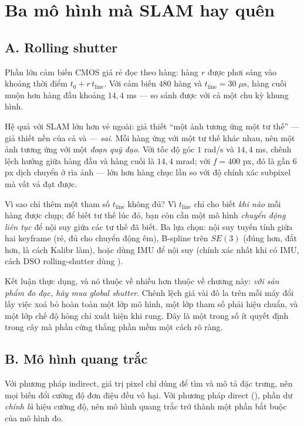 \documentclass[../../vslam.tex]{subfiles}
\begin{document}
\section{Ba mô hình mà SLAM hay quên}

\subsection{A. Rolling shutter}

Phần lớn cảm biến CMOS giá rẻ đọc theo hàng: hàng \(r\) được phơi sáng vào khoảng thời điểm \(t_0 + r\,t_{\text{line}}\). Với cảm biến \(480\) hàng và \(t_{\text{line}} = 30\;\mu\text{s}\), hàng cuối muộn hơn hàng đầu khoảng \(14{,}4\) ms --- so sánh được với cả một chu kỳ khung hình.

Hệ quả với SLAM lớn hơn vẻ ngoài: giả thiết ``một ảnh tương ứng một tư thế'' --- giả thiết nền của cả  và  --- \emph{sai}. Mỗi hàng ứng với một tư thế khác nhau, nên một ảnh tương ứng với một \emph{đoạn quỹ đạo}. Với tốc độ góc \(1\) rad/s và \(14{,}4\) ms, chênh lệch hướng giữa hàng đầu và hàng cuối là \(14{,}4\) mrad; với \(f = 400\) px, đó là gần \(6\) px dịch chuyển ở rìa ảnh --- lớn hơn hàng chục lần so với độ chính xác subpixel mà  vất vả đạt được.

Vì sao chỉ thêm một tham số \(t_{\text{line}}\) không đủ? Vì \(t_{\text{line}}\) chỉ cho biết \emph{khi nào} mỗi hàng được chụp; để biết tư thế lúc đó, bạn còn cần một mô hình \emph{chuyển động liên tục} để nội suy giữa các tư thế đã biết. Ba lựa chọn: nội suy tuyến tính giữa hai keyframe (rẻ, đủ cho chuyển động êm), B-spline trên \(SE(3)\) \cite{furgale2012continuous} (đúng hơn, đắt hơn, là cách Kalibr làm), hoặc dùng IMU để nội suy (chính xác nhất khi có IMU, cách DSO rolling-shutter dùng \cite{schubert2018rollingshutter}).

Kết luận thực dụng, và nó thuộc về  nhiều hơn thuộc về chương này: \emph{với sản phẩm đo đạc, hãy mua global shutter}. Chênh lệch giá vài đô la trên mỗi máy đổi lấy việc xoá bỏ hoàn toàn một lớp mô hình, một lớp tham số phải hiệu chuẩn, và một lớp chế độ hỏng chỉ xuất hiện khi rung. Đây là một trong số ít quyết định trong cây mà phần cứng thắng phần mềm một cách rõ ràng.

\subsection{B. Mô hình quang trắc}

Với phương pháp indirect, giá trị pixel chỉ dùng để tìm và mô tả đặc trưng, nên mọi biến đổi cường độ đơn điệu đều vô hại. Với phương pháp direct (), phần dư \emph{chính là} hiệu cường độ, nên mô hình quang trắc trở thành một phần bắt buộc của mô hình đo.
\end{document}
